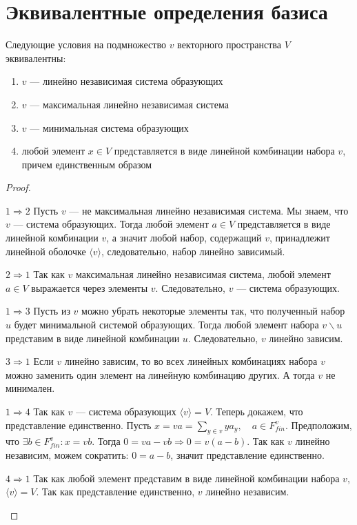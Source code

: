 \documentclass[11pt]{book}
\theoremstyle{definition}
\theoremstyle{plain}
\theoremstyle{plain}
\theoremstyle{definition}
\theoremstyle{remark}
\begin{document}
\section{Эквивалентные определения базиса}
\begin{thm}
    Следующие условия на подмножество $ v$ векторного пространства  $ V$ эквивалентны:
    \begin{enumerate}[label={\rm (\arabic*)},noitemsep]
	\item $ v$ --- линейно независимая система образующих
	\item $ v$ --- максимальная линейно независимая система
	\item $ v$ --- минимальная система образующих
	\item  любой элемент  $ x \in V$ представляется в виде линейной комбинации набора $ v$, причем единственным образом
    \end{enumerate}
\end{thm}
\begin{proof}
    $ $
    \begin{description}
	\item $ \boxed{1 \Longrightarrow 2}$ Пусть $ v$ ---  не максимальная линейно независимая система. Мы знаем, что $ v$ --- система образующих. Тогда любой элемент  $ a \in V$ представляется в виде линейной комбинации $ v$, а значит любой набор, содержащий  $ v$, принадлежит линейной оболочке  $ \langle v \rangle$, следовательно, набор линейно зависимый.
	\item $ \boxed{2 \Longrightarrow 1}$
	    Так как $ v$ максимальная линейно независимая система, любой элемент  $ a \in V$ выражается через элементы $ v$. Следовательно,  $ v$ --- система образующих.
	\item $ \boxed{1 \Longrightarrow 3}$ Пусть из $ v$ можно убрать некоторые элементы так, что полученный набор $ u$ будет минимальной системой образующих. Тогда любой элемент набора  $ v \smallsetminus u$ представим в виде линейной комбинации $ u$. Следовательно,  $ v$ линейно зависим.
	\item $ \boxed{3 \Longrightarrow 1}$ Если $ v$ линейно зависим, то во всех линейных комбинациях набора  $ v$ можно заменить один элемент на линейную комбинацию других. А тогда  $ v$ не минимален.
	\item  $ \boxed{1 \Longrightarrow 4}$ Так как $ v$ --- система образующих  $ \langle v \rangle = V$. Теперь докажем, что представление единственно. Пусть $ x = va = \sum_{y \in v} y a_y, \quad a \in F^{v}_{fin}$.
	    Предположим, что $ \exists b \in F_{fin}^{v}: x = vb$. Тогда  $ 0 = va - vb \Longrightarrow 0 = v(a-b)$. Так как $ v$ линейно независим, можем сократить:  $ 0 = a-b$, значит представление единственно.
	\item $ \boxed{4 \Longrightarrow 1}$ Так как любой элемент представим в виде линейной комбинации набора $ v$,  $ \langle v \rangle = V$. Так как представление единственно, $ v$ линейно независим.
    \end{description}
\end{proof}
\end{document}

